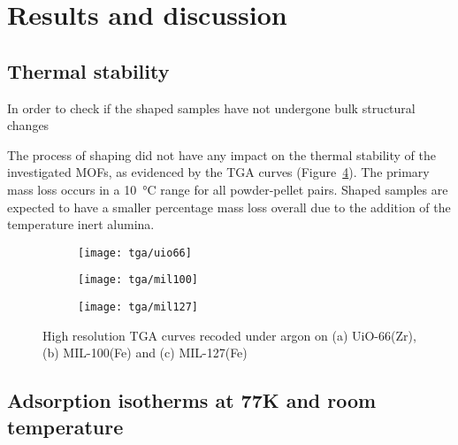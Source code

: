 
\section{Results and discussion}

\subsection{Thermal stability}

In order to check if the shaped samples have not undergone bulk
structural changes

The process of shaping did not have any impact on the thermal stability of 
the investigated MOFs, as evidenced by the TGA curves 
(Figure~\ref{fig:ch4:tgacurves}). The primary mass loss occurs 
in a \SI{10}{\degreeCelsius} range for all powder-pellet pairs.
Shaped samples are expected to have a smaller percentage mass loss 
overall due to the addition of the temperature inert alumina. 

\begin{figure}
    \centering
    \begin{subfigure}{0.6\textwidth}
        \parbox[c]{0.1\linewidth}{\caption{}\label{fig:ch4:tgauio66}}%
        \parbox[b]{0.7\linewidth}{%
        \texttt{[image: tga/uio66]}%
        }%
    \end{subfigure}

    \begin{subfigure}{0.6\textwidth}
        \parbox[c]{0.1\linewidth}{\caption{}\label{fig:ch4:tgamil100}}%
        \parbox[b]{0.7\linewidth}{%
        \texttt{[image: tga/mil100]}%
        }%
    \end{subfigure}

    \begin{subfigure}{0.6\textwidth}
        \parbox[c]{0.1\linewidth}{\caption{}\label{fig:ch4:tgamil127}}%
        \parbox[b]{0.7\linewidth}{%
        \texttt{[image: tga/mil127]}%
        }%
    \end{subfigure}
    
    \caption{High resolution TGA curves recoded under argon 
    on (a) UiO-66(Zr), (b) MIL-100(Fe) and (c) MIL-127(Fe)}%
    \label{fig:ch4:tgacurves}

\end{figure}

\subsection{Adsorption isotherms at 77K and room temperature}

